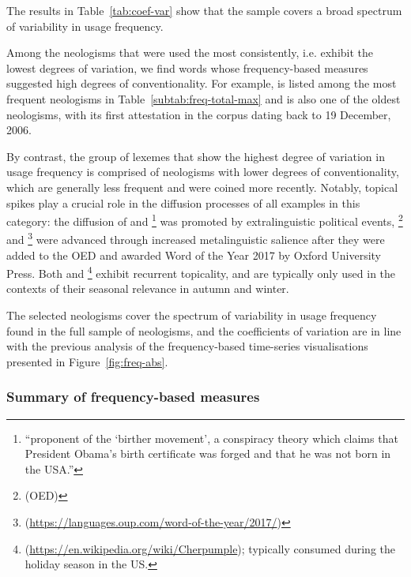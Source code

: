 \documentclass[
  a4paper,
  abstract=on,
  captions=tableabove
  ]{scrartcl}
\begin{document}
      The results in Table~\ref{tab:coef-var} show that the sample covers a broad spectrum of variability in usage frequency.

      Among the neologisms that were used the most consistently, i.e. exhibit the lowest degrees of variation, we find words whose frequency-based measures suggested high degrees of conventionality. For example,  is listed among the most frequent neologisms in Table~\ref{subtab:freq-total-max} and is also one of the oldest neologisms, with its first attestation in the corpus dating back to 19 December, 2006.

      By contrast, the group of lexemes that show the highest degree of variation in usage frequency is comprised of neologisms with lower degrees of conventionality, which are generally less frequent and were coined more recently. Notably, topical spikes play a crucial role in the diffusion processes of all examples in this category: the diffusion of  and \footnote{\enquote{proponent of the \enquote{birther movement}, a conspiracy theory which claims that President Obama's birth certificate was forged and that he was not born in the USA.}} was promoted by extralinguistic political events, \footnote{ (OED)} and \footnote{ (\url{https://languages.oup.com/word-of-the-year/2017/})} were advanced through increased metalinguistic salience after they were added to the OED and awarded Word of the Year 2017 by Oxford University Press. Both  and \footnote{ (\url{https://en.wikipedia.org/wiki/Cherpumple}); typically consumed during the holiday season in the US.} exhibit recurrent topicality, and are typically only used in the contexts of their seasonal relevance in autumn and winter.

      The selected neologisms cover the spectrum of variability in usage frequency found in the full sample of neologisms, and the coefficients of variation are in line with the previous analysis of the frequency-based time-series visualisations presented in Figure~\ref{fig:freq-abs}.


      \subsubsection{Summary of frequency-based measures}
        \label{subsubsec:freq-summary}
\end{document}

